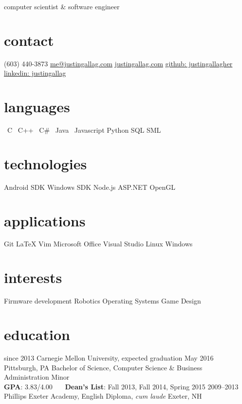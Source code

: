 \documentclass[print]{friggeri-cv}
\newcommand{\starr}{\raisebox{0.2ex}{$\star $}}
\begin{document}
    {computer scientist \& software engineer}

    \begin{aside}
        \section{contact}
            (603) 440-3873
            \href{mailto:me@justingallag.com}{me@justingallag.com}
            \href{http://justingallag.com}{justingallag.com}
            \href{https://github.com/justingallagher}{github: justingallagher}
            \href{https://www.linkedin.com/in/justingallag}{linkedin: justingallag}
        \section{languages}
            \starr \ C
            \starr \ C++
            \starr \ C\#
            \starr \ Java
            \starr \ Javascript
            Python
            SQL
            SML
        \section{technologies}
            Android SDK
            Windows SDK
            Node.js
            ASP.NET
            OpenGL
        \section{applications}
            Git
            LaTeX
            Vim
            Microsoft Office
            Visual Studio
            Linux
            Windows
        \section{interests}
            Firmware development
            Robotics
            Operating Systems
            Game Design
    \end{aside}

    \section{education}

    \begin{entrylist}
        \entry
            {since 2013}
            {Carnegie Mellon University, {\normalfont expected graduation May 2016}}
            {Pittsburgh, PA}
            {Bachelor of Science, Computer Science \& Business Administration Minor\\
            \textbf{GPA}: 3.83/4.00 \ \ \ \textbf{Dean's List}: Fall 2013, Fall 2014, Spring 2015}
        \entrys
            {2009--2013}
            {Phillips Exeter Academy, {\normalfont English Diploma, \emph{cum laude}}}
            {Exeter, NH}
            {}
    \end{entrylist}
\end{document}
